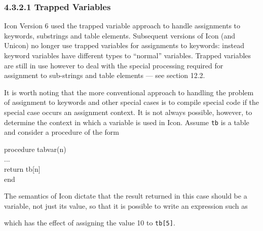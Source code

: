 \subsubsection[4.3.2.1 Trapped Variables]{4.3.2.1 Trapped Variables}

Icon Version 6 used the trapped variable approach to handle assignments to
keywords, substrings and table elements. Subsequent versions of Icon (and
Unicon) no longer use trapped variables for assignments to keywords:
instead keyword variables have different types to ``normal''
variables. Trapped variables are still in use however to deal with the
special processing required for assignment to sub-strings and table
elements --- see section 12.2.



It is worth noting that the more conventional approach to handling the
problem of assignment to keywords and other special cases is to compile
special code if the special case occurs an assignment context. It is not
always possible, however, to determine the context in which a variable is
used in Icon. Assume \texttt{tb} is a table and consider a procedure of the form

\begin{iconcode}
\>procedure tabvar(n)\\
\> ...\\
\>return tb[n]\\
\>end
\end{iconcode}

The semantics of Icon dictate that the result returned in this case
should be a variable, not just its value, so that it is possible to
write an expression such as


\noindent
which has the effect of assigning the value 10 to \texttt{tb[5]}.

